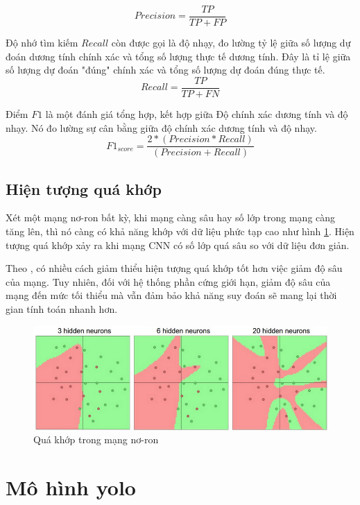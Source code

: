 \begin{equation}
	\label{eqn:prec}
	Precision = \frac{TP}{TP + FP}
\end{equation}	

Độ nhớ tìm kiếm $Recall$ còn được gọi là độ nhạy, đo lường tỷ lệ giữa số lượng dự đoán dương tính chính xác và tổng số lượng thực tế dương tính. Đây là tỉ lệ giữa số lượng dự đoán "đúng" chính xác và tổng số lượng dự đoán đúng thực tế.
\begin{equation}
	\label{eqn:recall}
	Recall = \frac{TP}{TP + FN}
\end{equation}	
	
Điểm $F\mathit{1}$ là một đánh giá tổng hợp, kết hợp giữa Độ chính xác dương tính và độ nhạy. Nó đo lường sự cân bằng giữa độ chính xác dương tính và độ nhạy. 
\begin{equation}
	\label{eqn:f1}
	F\mathit{1}_{score} = \frac{2 * (Precision * Recall)}{(Precision + Recall)}
\end{equation}

\subsection{Hiện tượng quá khớp}

Xét một mạng nơ-ron bất kỳ, khi mạng càng sâu hay số lớp trong mạng càng tăng lên, thì nó càng có khả năng khớp với dữ liệu phức tạp cao như hình \ref{fig:overfitting}. Hiện tượng quá khớp xảy ra khi mạng CNN có số lớp quá sâu so với dữ liệu đơn giản.

Theo \cite{karpathy}, có nhiều cách giảm thiểu hiện tượng quá khớp tốt hơn việc giảm độ sâu của mạng. Tuy nhiên, đối với hệ thống phần cứng giới hạn, giảm độ sâu của mạng đến mức tối thiểu mà vẫn đảm bảo khả năng suy đoán sẽ mang lại thời gian tính toán nhanh hơn.

\begin{figure}[h]
	\centering
	\includegraphics[width=0.7\linewidth]{images/overfitting}
	\caption{Quá khớp trong mạng nơ-ron}
	\label{fig:overfitting}
\end{figure}

\section{Mô hình \acrshort{yolo}}

